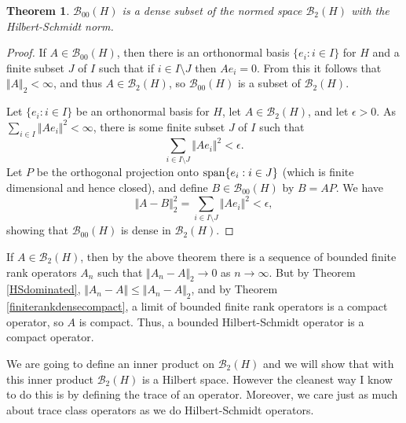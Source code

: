 \documentclass{article}
\newcommand{\Span}{\ensuremath\mathrm{span}}
\newcommand{\norm}[1]{\Vert #1 \Vert}
\newtheorem{theorem}{Theorem}
\begin{document}
\begin{theorem}
$\mathscr{B}_{00}(H)$ is a dense subset of the normed space $\mathscr{B}_2(H)$ with the Hilbert-Schmidt norm.
\end{theorem}
\begin{proof}
If $A \in \mathscr{B}_{00}(H)$, then there is an orthonormal basis $\{e_i: i \in I\}$  for $H$ and a finite subset $J$ of $I$
such that if $i \in I \setminus J$ then
$Ae_i=0$.
From this it follows that $\norm{A}_2<\infty$, and thus $A \in \mathscr{B}_2(H)$, so $\mathscr{B}_{00}(H)$ is a subset of $\mathscr{B}_2(H)$.

Let $\{e_i:i \in I\}$ be an orthonormal basis for $H$, let 
$A \in \mathscr{B}_2(H)$, and let $\epsilon>0$.   As $\sum_{i \in I} \norm{Ae_i}^2 < \infty$,
there is some finite subset $J$ of $I$ such that 
\[
\sum_{i \in I \setminus J} \norm{Ae_i}^2 < \epsilon.
\] 
Let $P$ be the orthogonal projection onto $\Span\{e_i: i \in J\}$ (which is finite dimensional and hence closed), and define
$B \in \mathscr{B}_{00}(H)$ by $B=AP$.
We have
\[
\norm{A-B}_2^2 = \sum_{i \in I \setminus J} \norm{Ae_i}^2 < \epsilon,
\]
showing that $\mathscr{B}_{00}(H)$ is dense in $\mathscr{B}_2(H)$.
\end{proof}


If $A \in \mathscr{B}_2(H)$, then by the above theorem there is a sequence of bounded finite rank operators $A_n$ such that
$\norm{A_n-A}_2 \to 0$ as $n \to \infty$. But by Theorem \ref{HSdominated}, $\norm{A_n-A} \leq \norm{A_n-A}_2$,
and by Theorem \ref{finiterankdensecompact}, a limit of bounded finite rank operators is a compact operator, so $A$ is compact.
Thus, a bounded Hilbert-Schmidt operator is a compact operator.


We are going to define an inner product on $\mathscr{B}_2(H)$ and we will show that with this inner product $\mathscr{B}_2(H)$ is a Hilbert space. However
the cleanest way I know to do this is by defining the trace of an operator. Moreover, we care just as much about trace class operators as we do Hilbert-Schmidt operators.
\end{document}
